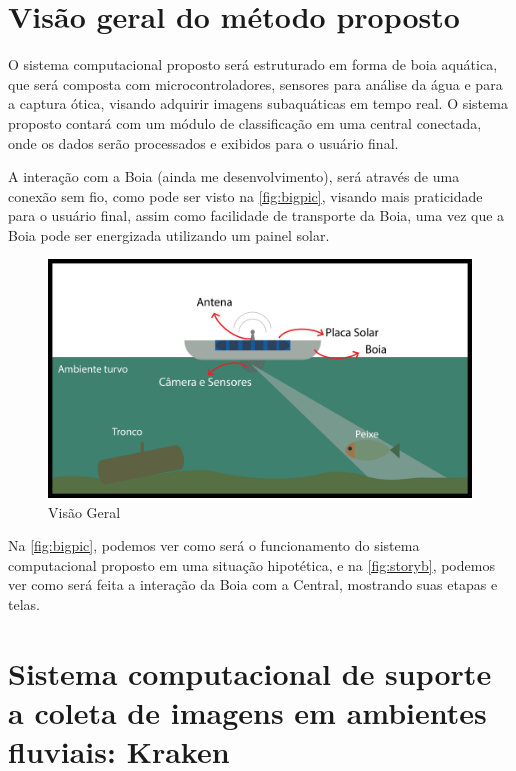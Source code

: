 \label{chapter:metodo}
\section{Visão geral do método proposto}
   
O sistema computacional proposto será estruturado em forma de boia aquática, que será composta com microcontroladores, sensores para análise da água e para a captura ótica, visando adquirir imagens subaquáticas em tempo real. O sistema proposto contará com um módulo de classificação em uma central conectada, onde os dados serão processados e exibidos para o usuário final. 

A interação com a Boia (ainda me desenvolvimento), será através de uma conexão sem fio, como pode ser visto na \autoref{fig:bigpic}, visando mais praticidade para o usuário final, assim como facilidade de transporte da Boia, uma vez que a Boia pode ser energizada utilizando um painel solar.

 
   

\begin{figure}[ht]
	\centering
    \caption{\label{fig:bigpic}Visão Geral}
	\includegraphics[width = \textwidth]{resources/bugpicturefloater}
\end{figure}

Na \autoref{fig:bigpic}, podemos ver como será o funcionamento do sistema computacional proposto em uma situação hipotética, e na \autoref{fig:storyb}, podemos ver como será feita a interação da Boia com a Central, mostrando suas etapas e telas. 

\section{Sistema computacional de suporte a coleta de imagens em ambientes fluviais: Kraken}


